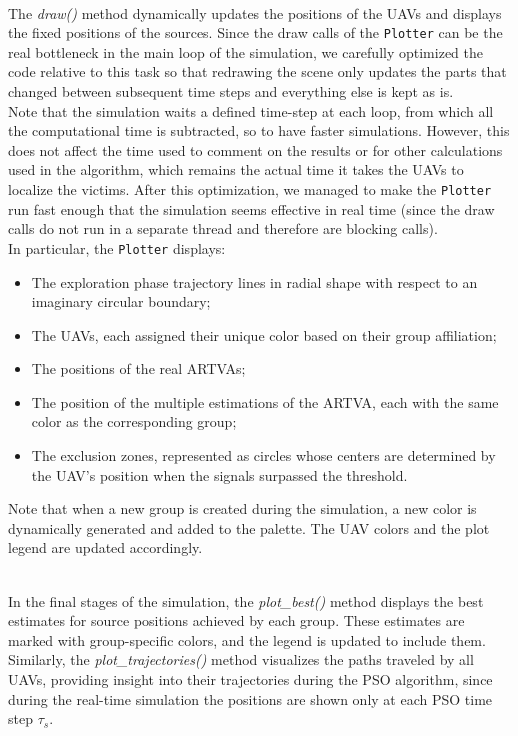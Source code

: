 \documentclass[main]{subfiles}
\begin{document}
\noindent\\
The \textit{draw()} method dynamically updates the positions of the 
UAVs and displays the fixed positions of the sources.
Since the draw calls of the \texttt{Plotter} can be the real bottleneck in the 
main loop of the simulation, we carefully optimized the code relative 
to this task so that redrawing the scene only updates the parts that 
changed between subsequent time steps and everything else is kept as is.\\
Note that the simulation waits a defined time-step at each loop, 
from which all the computational time is subtracted, so to have faster simulations. 
However, this does not affect the time used to comment on the results or for other 
calculations used in the algorithm, which remains the actual time it takes the 
UAVs to localize the victims. After this optimization, 
we managed to make the \texttt{Plotter} run fast 
enough that the simulation seems effective in real time (since 
the draw calls do not run in a separate thread and therefore are blocking calls).\\

\noindent
In particular, the \texttt{Plotter} displays:
\begin{itemize}
    \item The exploration phase trajectory lines in radial shape with respect to 
 an imaginary circular boundary; 
    \item The UAVs, each assigned their unique color based on their group affiliation;
    \item The positions of the real ARTVAs; 
    \item The position of the multiple estimations of the ARTVA, each with 
 the same color as the corresponding group;
    \item The exclusion zones, represented as circles whose centers are determined
 by the UAV's position when the signals surpassed the threshold. 
\end{itemize}
Note that when a new group is created during 
the simulation, a new color is dynamically generated and added 
to the palette. The UAV colors and the plot legend are updated 
accordingly.

\noindent\\
In the final stages of the simulation, the \textit{plot\_best()} 
method displays the best estimates for source positions achieved 
by each group. These estimates are marked with group-specific colors, 
and the legend is updated to include them. Similarly, 
the \textit{plot\_trajectories()} method visualizes the paths 
traveled by all UAVs, providing insight into their trajectories
during the PSO algorithm, since during the real-time simulation
the positions are shown only at each PSO time step $\tau_s$.
\end{document}
